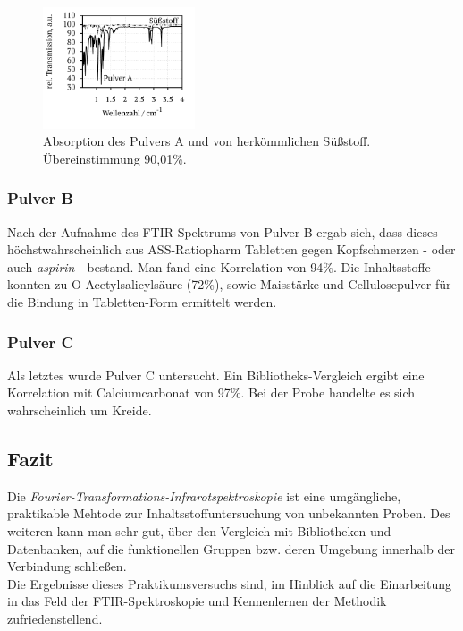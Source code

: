 \documentclass[a4paper,10pt,twocolumn]{article}
\newcommand{\tilt}[1]{\textit{#1}}
\begin{document}
			\begin{figure}[h]
			\centering
				\includegraphics[width=0.4\textwidth]{Gruppe2A/pulver_a.pdf}
				\caption{Absorption des Pulvers A und von herk\"ommlichen S\"u{\ss}stoff. \"Ubereinstimmung 90,01\%.}
				\label{img:a}
			\end{figure}

		\subsubsection{Pulver B}

		Nach der  Aufnahme des FTIR-Spektrums von Pulver B ergab sich, dass dieses h\"ochstwahrscheinlich aus ASS-Ratiopharm Tabletten gegen Kopfschmerzen - oder auch \tilt{aspirin} - bestand. Man fand eine Korrelation von 94\%. Die Inhaltsstoffe konnten zu O-Acetylsalicyls\"aure (72\%), sowie Maisst\"arke und Cellulosepulver f\"ur die Bindung in Tabletten-Form ermittelt werden.

		\subsubsection{Pulver C}
	
		Als letztes wurde Pulver C untersucht. Ein Bibliotheks-Vergleich ergibt eine Korrelation mit Calciumcarbonat von 97\%. Bei der Probe handelte es sich wahrscheinlich um Kreide.
		
		\subsection{Fazit}

		Die \tilt{Fourier-Transformations-Infrarotspektroskopie} ist eine umg\"angliche, praktikable Mehtode zur Inhaltsstoffuntersuchung von unbekannten Proben. Des weiteren kann man sehr gut, \"uber den Vergleich mit Bibliotheken und Datenbanken, auf die funktionellen Gruppen bzw. deren Umgebung innerhalb der Verbindung schlie{\ss}en.\\
		Die Ergebnisse dieses Praktikumsversuchs sind, im Hinblick auf die Einarbeitung in das Feld der FTIR-Spektroskopie und Kennenlernen der Methodik zufriedenstellend. 
\end{document}
